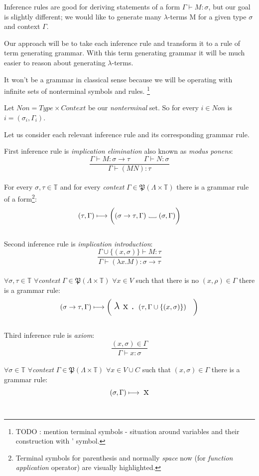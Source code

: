 \documentclass[12pt,a4paper]{report}
\newcommand{\Lets}{Let us }
\newcommand{\lterms}{$\lambda$-terms\xspace}
\newcommand{\turst}[3]{$#1 \vdash #2 : #3$\xspace}
\newcommand{\GMS}{\turst{\Gamma}{M}{\sigma}}
\newcommand\Vtextvisiblespace[1][.3em]{%
  \mbox{\kern.06em\vrule height.3ex}%
  \vbox{\hrule width#1}%
  \hbox{\vrule height.3ex}}
\begin{document}
Inference rules are good for deriving statements of a form \GMS, but our
goal is slightly different; we would like to generate many \lterms M for a given type 
$\sigma$ and context $\Gamma$.

Our approach will be to take each inference rule and transform it to a rule of term generating
grammar. With this term generating grammar it will be much easier to reason about generating 
\lterms.
	
It won't be a grammar in classical sense because we will be operating with infinite sets of
nonterminal symbols and rules. \footnote{TODO : mention terminal symbols - situation around 
variables and their construction with ' symbol.}

Let $Non = Type \times Context $ be our {\it nonterminal} set. 
So for every $i \in Non$ is $i = (\sigma_i , \Gamma_i )$.

\Lets consider each relevant inference rule and its corresponding grammar rule.

First inference rule is {\it implication elimination} also known as 
{\it modus ponens}: 
\[
	\frac{\Gamma \vdash M : \sigma \rightarrow \tau \qquad
		  \Gamma \vdash N : \sigma }
	     {\Gamma \vdash (M N) : \tau }
\]
\\
For every $\sigma, \tau \in \mathbb{T}$ and for every {\it context} 
$\Gamma \in \mathfrak P \left({\Lambda \times  \mathbb{T}}\right)$ there is a grammar rule of a form\footnote{ 
Terminal symbols for parenthesis and normally {\it space} now \textvisiblespace \quad (for {\it function application} operator) are visually highlighted. }: 
\[	
	( \tau , \Gamma )  \longmapsto
	\bigg( ( \sigma \rightarrow \tau , \Gamma ) 
	  \mbox{ \Vtextvisiblespace[1em] } ( \sigma , \Gamma ) \bigg)
\]
\\

Second inference rule is {\it implication introduction}: 
\[
	\frac{\Gamma \cup \{ ( x,\sigma ) \} \vdash M : \tau }
	     {\Gamma \vdash (\lambda x . M) : \sigma \rightarrow \tau }
\]
\\
$\forall \sigma, \tau \in \mathbb{T}$ 
$\forall${\it context} $\Gamma \in \mathfrak P \left({\Lambda \times  \mathbb{T}}\right) $ 
$\forall x \in V $ such that there is no $(x,\rho) \in \Gamma$ 
there is a grammar rule:
\[ 
	( \sigma \rightarrow \tau , \Gamma )  \longmapsto
	\bigg( \mbox{ {\Large $\lambda$ x . }}( \tau , \Gamma \cup \{ (x,\sigma) \} ) \quad \bigg)
\]
\\	

Third inference rule is {\it axiom}: 
\[
		\frac{( x , \sigma )  \in \Gamma}
		     {\Gamma \vdash x : \sigma}
\]
\\
$\forall \sigma \in \mathbb{T}$ 
$\forall${\it context} $\Gamma \in \mathfrak P \left({\Lambda \times  \mathbb{T}}\right) $ 
$\forall x \in V \cup C $ such that $(x,\sigma) \in \Gamma$ 
there is a grammar rule:
\[ 
	( \sigma , \Gamma )  \longmapsto \mbox{ {\Large x}}
\]
\\
\end{document}

